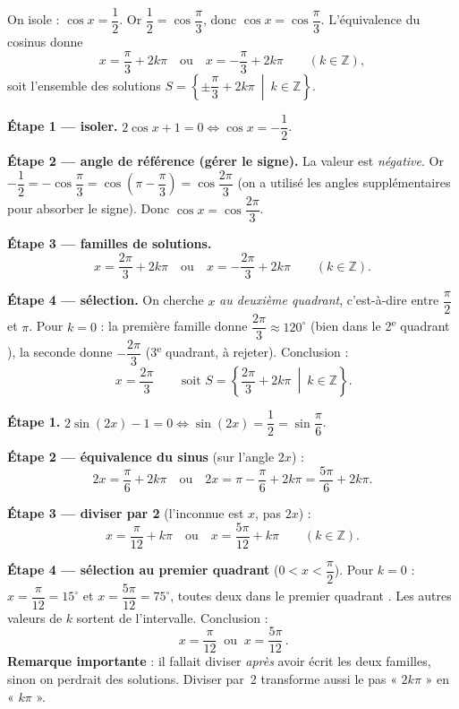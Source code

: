 \documentclass[11pt,a4paper]{article}
\newcommand{\degr}{^{\circ}}
\newcommand{\Z}{\mathbb{Z}}
\begin{document}
\begin{exemple}[équation simple en cosinus : $2\cos x=1$]
On isole : $\cos x=\dfrac12$. Or $\dfrac12=\cos\dfrac{\pi}{3}$, donc $\cos x=\cos\dfrac{\pi}{3}$.
L'équivalence du cosinus donne
\[
x=\frac{\pi}{3}+2k\pi\quad\text{ou}\quad x=-\frac{\pi}{3}+2k\pi\qquad(k\in\Z),
\]
soit l'ensemble des solutions $S=\left\{\pm\dfrac{\pi}{3}+2k\pi\ \middle|\ k\in\Z\right\}$.
\end{exemple}

\begin{exemple}[avec contrainte d'intervalle : $2\cos x+1=0$, $x$ au deuxième quadrant]
\textbf{Étape 1 --- isoler.} $2\cos x+1=0\iff\cos x=-\dfrac12$.

\textbf{Étape 2 --- angle de référence (gérer le signe).} La valeur est \emph{négative}.
Or $-\dfrac12=-\cos\dfrac{\pi}{3}=\cos\!\left(\pi-\dfrac{\pi}{3}\right)=\cos\dfrac{2\pi}{3}$
(on a utilisé les angles supplémentaires pour absorber le signe). Donc $\cos x=\cos\dfrac{2\pi}{3}$.

\textbf{Étape 3 --- familles de solutions.}
\[
x=\frac{2\pi}{3}+2k\pi\quad\text{ou}\quad x=-\frac{2\pi}{3}+2k\pi\qquad(k\in\Z).
\]

\textbf{Étape 4 --- sélection.} On cherche $x$ \emph{au deuxième quadrant}, c'est-à-dire entre
$\dfrac{\pi}{2}$ et $\pi$. Pour $k=0$ : la première famille donne $\dfrac{2\pi}{3}\approx120\degr$
(bien dans le 2\textsuperscript{e} quadrant \checkmark), la seconde donne $-\dfrac{2\pi}{3}$
(3\textsuperscript{e} quadrant, à rejeter). Conclusion :
\[
\boxed{\,x=\frac{2\pi}{3}\,}\qquad\text{soit } S=\left\{\frac{2\pi}{3}+2k\pi\ \middle|\ k\in\Z\right\}.
\]
\end{exemple}

\begin{exemple}[équation avec un angle double : $2\sin(2x)-1=0$, $x$ au premier quadrant]
\textbf{Étape 1.} $2\sin(2x)-1=0\iff\sin(2x)=\dfrac12=\sin\dfrac{\pi}{6}$.

\textbf{Étape 2 --- équivalence du sinus} (sur l'angle $2x$) :
\[
2x=\frac{\pi}{6}+2k\pi\quad\text{ou}\quad 2x=\pi-\frac{\pi}{6}+2k\pi=\frac{5\pi}{6}+2k\pi.
\]

\textbf{Étape 3 --- diviser par 2} (l'inconnue est $x$, pas $2x$) :
\[
x=\frac{\pi}{12}+k\pi\quad\text{ou}\quad x=\frac{5\pi}{12}+k\pi\qquad(k\in\Z).
\]

\textbf{Étape 4 --- sélection au premier quadrant} ($0<x<\dfrac{\pi}{2}$). Pour $k=0$ :
$x=\dfrac{\pi}{12}=15\degr$ et $x=\dfrac{5\pi}{12}=75\degr$, toutes deux dans le premier quadrant
\checkmark. Les autres valeurs de $k$ sortent de l'intervalle. Conclusion :
\[
\boxed{\,x=\frac{\pi}{12}\ \text{ ou }\ x=\frac{5\pi}{12}\,}.
\]
\textbf{Remarque importante} : il fallait diviser \emph{après} avoir écrit les deux familles, sinon
on perdrait des solutions. Diviser par~2 transforme aussi le pas « $2k\pi$ » en « $k\pi$ ».
\end{exemple}
\end{document}
